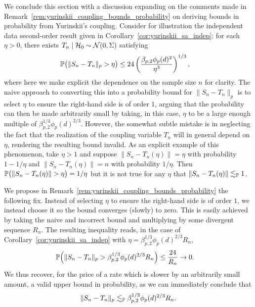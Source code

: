 We conclude this section with a discussion expanding on the comments made
in Remark~\ref{rem:yurinskii_coupling_bounds_probability} on deriving bounds in
probability from Yurinskii's coupling. Consider for illustration the
independent data second-order result given in
Corollary~\ref{cor:yurinskii_sa_indep}: for each $\eta > 0$,
there exists $T_n \mid \cH_0 \sim \cN(0, \Sigma)$ satisfying
%
\begin{align*}
  \P\big(\|S_n-T_n\|_p > \eta\big)
  &\leq
  24 \left(
    \frac{\beta_{p,2} \phi_p(d)^2}{\eta^3}
  \right)^{1/3},
\end{align*}
%
where here we make explicit the dependence on the sample size $n$ for clarity.
The naive approach to converting this into a probability bound for
$\|S_n-T_n\|_p$ is to select $\eta$ to ensure the right-hand side is
of order $1$, arguing that the probability can then be made arbitrarily
small by taking, in this case, $\eta$ to be a large enough multiple of
$\beta_{p,2}^{1/3} \phi_p(d)^{2/3}$. However, the somewhat subtle mistake is
in neglecting the fact that the realization of the coupling variable $T_n$
will in general depend on $\eta$, rendering the resulting
bound invalid.
As an explicit example of this phenomenon, take $\eta > 1$ and suppose
$\|S_n - T_n(\eta)\| = \eta$ with probability $1 - 1/\eta$ and
$\|S_n - T_n(\eta)\| = n$ with probability $1/\eta$.
Then $\P\big(\|S_n - T_n(\eta)\| > \eta\big) = 1/\eta$
but it is not true for any $\eta$ that $\|S_n - T_n(\eta)\| \lesssim_\P 1$.

We propose in Remark~\ref{rem:yurinskii_coupling_bounds_probability} the
following fix.
Instead of selecting $\eta$ to ensure the right-hand side is of order $1$,
we instead choose it so the bound converges (slowly) to zero. This is
easily achieved by taking the naive and incorrect bound and multiplying
by some divergent sequence $R_n$. The resulting inequality reads,
in the case of Corollary~\ref{cor:yurinskii_sa_indep} with
$\eta = \beta_{p,2}^{1/3} \phi_p(d)^{2/3} R_n$,
%
\begin{align*}
  \P\Big(\|S_n-T_n\|_p >
    \beta_{p,2}^{1/3} \phi_p(d)^{2/3} R_n
  \Big)
  &\leq
  \frac{24}{R_n}
  \to 0.
\end{align*}
%
We thus recover, for the price of a rate which is slower by an arbitrarily
small amount, a valid upper bound in probability, as we can immediately
conclude that
%
\begin{align*}
  \|S_n-T_n\|_p
  \lesssim_\P
  \beta_{p,2}^{1/3} \phi_p(d)^{2/3} R_n.
\end{align*}

